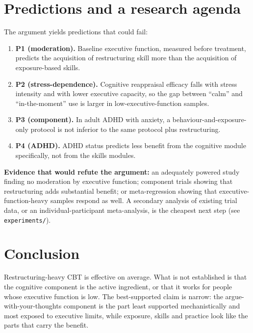 \section{Predictions and a research agenda}\label{sec:agenda}
The argument yields predictions that could fail:
\begin{enumerate}
\item \textbf{P1 (moderation).} Baseline executive function, measured before treatment, predicts the acquisition of restructuring skill more than the acquisition of exposure-based skills.
\item \textbf{P2 (stress-dependence).} Cognitive reappraisal efficacy falls with stress intensity and with lower executive capacity, so the gap between ``calm'' and ``in-the-moment'' use is larger in low-executive-function samples.
\item \textbf{P3 (component).} In adult ADHD with anxiety, a behaviour-and-exposure-only protocol is not inferior to the same protocol plus restructuring.
\item \textbf{P4 (ADHD).} ADHD status predicts less benefit from the cognitive module specifically, not from the skills modules.
\end{enumerate}
\textbf{Evidence that would refute the argument:} an adequately powered study finding no moderation by executive function; component trials showing that restructuring adds substantial benefit; or meta-regression showing that executive-function-heavy samples respond as well. A secondary analysis of existing trial data, or an individual-participant meta-analysis, is the cheapest next step (see \texttt{experiments/}).

\section{Conclusion}
Restructuring-heavy CBT is effective on average. What is not established is that the cognitive component is the active ingredient, or that it works for people whose executive function is low. The best-supported claim is narrow: the argue-with-your-thoughts component is the part least supported mechanistically and most exposed to executive limits, while exposure, skills and practice look like the parts that carry the benefit.
